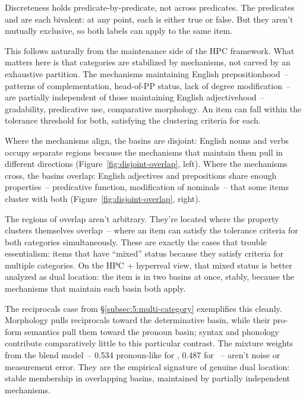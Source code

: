 Discreteness holds predicate-by-predicate, not across predicates. The predicates  and  are each bivalent: at any point, each is either true or false. But they aren't mutually exclusive, so both labels can apply to the same item.

This follows naturally from the maintenance side of the HPC framework. What matters here is that categories are stabilized by mechanisms, not carved by an exhaustive partition. The mechanisms maintaining English prepositionhood~-- patterns of complementation, head-of-PP status, lack of degree modification~-- are partially independent of those maintaining English adjectivehood~-- gradability, predicative use, comparative morphology. An item can fall within the tolerance threshold for both, satisfying the clustering criteria for each.

Where the mechanisms align, the basins are disjoint: English nouns and verbs occupy separate regions because the mechanisms that maintain them pull in different directions (Figure~\ref{fig:disjoint-overlap}, left). Where the mechanisms cross, the basins overlap: English adjectives and prepositions share enough properties~-- predicative function, modification of nominals~-- that some items cluster with both (Figure~\ref{fig:disjoint-overlap}, right).

The regions of overlap aren't arbitrary. They're located where the property clusters themselves overlap~-- where an item can satisfy the tolerance criteria for both categories simultaneously. These are exactly the cases that trouble essentialism: items that have \enquote{mixed} status because they satisfy criteria for multiple categories. On the HPC + hyperreal view, that mixed status is better analyzed as dual location: the item is in two basins at once, stably, because the mechanisms that maintain each basin both apply.

The reciprocals case from §\ref{subsec:5:multi-category} exemplifies this cleanly. Morphology pulls reciprocals toward the determinative basin, while their pro-form semantics pull them toward the pronoun basin; syntax and phonology contribute comparatively little to this particular contrast. The mixture weights from the blend model~-- 0.534 pronoun-like for , 0.487 for ~-- aren't noise or measurement error. They are the empirical signature of genuine dual location: stable membership in overlapping basins, maintained by partially independent mechanisms.

